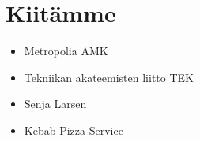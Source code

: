 %	
%	  

\section*{Kiitämme}
\begin{itemize}
\item Metropolia AMK
\item Tekniikan akateemisten liitto TEK
\item Senja Larsen
\item Kebab Pizza Service
\end{itemize}


